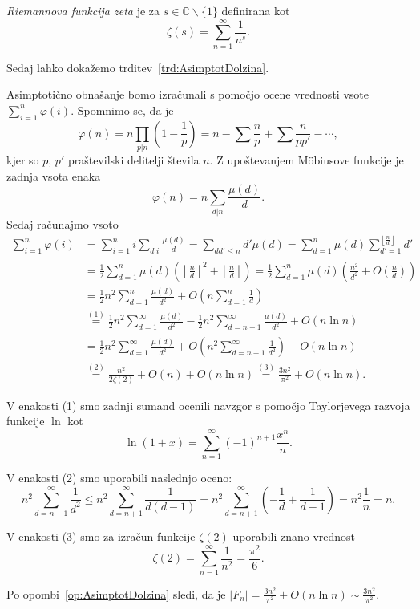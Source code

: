 \documentclass[mat1]{fmfdelo}
\begin{document}
\begin{definicija}
\emph{Riemannova funkcija zeta} je za
 $s\in\mathbb{C}\backslash\{1\}$
definirana kot
\[ \zeta(s) = \sum_{n=1}^{\infty}\frac{1}{n^s}. \]
\end{definicija}

%
Sedaj lahko dokažemo trditev~\ref{trd:AsimptotDolzina}.

\begin{dokaz}
Asimptotično obnašanje bomo izračunali s pomočjo ocene vrednosti vsote \( \sum_{i=1}^n \varphi(i) \).
Spomnimo se, da je \[ \varphi(n) = n \prod_{p|n} \left (1 - \frac{1}{p} \right ) = n - \sum \frac{n}{p} + \sum \frac{n}{pp'} - \cdots , \]
kjer so $p$, $p'$ praštevilski delitelji števila $n$.  Z upoštevanjem M\"obiusove funkcije je zadnja vsota enaka
\[ \varphi(n) = n \sum_{d|n} \frac{\mu(d)}{d} .\]
Sedaj računajmo vsoto 
%
\begin{align*}
\sum_{i=1}^n \varphi(i)
  &= \sum_{i=1}^n i \sum_{d|i} \frac{\mu(d)}{d} = \sum_{dd'\leq n}d' \mu(d) = 
    \sum_{d=1}^n \mu(d) \sum_{d'=1}^{\left \lfloor \frac{n}{d} \right \rfloor} d' \\
  &= \frac{1}{2} \sum_{d=1}^{n} \mu(d) \left (\left \lfloor \frac{n}{d} \right \rfloor ^2 + \left \lfloor \frac{n}{d} \right \rfloor \right) =
    \frac{1}{2} \sum_{d=1}^{n} \mu(d) \left (\frac{n^2}{d^2} + O \left (\frac{n}{d} \right) \right) \\
  &= \frac{1}{2}n^2 \sum_{d=1}^{n} \frac{\mu(d)}{d^2} + O \left (n \sum_{d=1}^{n} \frac{1}{d} \right ) \\
  &\stackrel{(1)}{=} \frac{1}{2}n^2 \sum_{d=1}^{\infty} \frac{\mu(d)}{d^2} - \frac{1}{2}n^2 \sum_{d=n+1}^{\infty} \frac{\mu(d)}{d^2} + O(n \ln{n}) \\
  &= \frac{1}{2}n^2 \sum_{d=1}^{\infty} \frac{\mu(d)}{d^2} + O \left (n^2\sum_{d=n+1}^{\infty} \frac{1}{d^2} \right ) + O(n \ln{n}) \\
  & \stackrel{(2)}{=} \frac{n^2}{2 \zeta(2)} + O(n) + O(n \ln{n}) \stackrel{(3)}{=} \frac{3n^2}{\pi^2} + O(n \ln{n}).
\end{align*}

V enakosti (1) smo zadnji sumand ocenili navzgor s pomočjo Taylorjevega razvoja funkcije $\ln$ kot
\[ \ln{(1+x)} = \sum_{n=1}^{\infty} (-1)^{n+1} \frac{x^n}{n}.\]

V enakosti (2) smo uporabili naslednjo oceno:
\[ n^2 \sum_{d=n+1}^{\infty} \frac{1}{d^2} \leq n^2 \sum_{d=n+1}^{\infty} \frac{1}{d(d-1)} = 
n^2 \sum_{d=n+1}^{\infty} \left (- \frac{1}{d} + \frac{1}{d-1} \right ) = n^2 \frac{1}{n} = n.\]

V enakosti (3) smo za izračun funkcije $\zeta(2)$ uporabili znano vrednost
\[ \zeta(2) = \sum_{n=1}^{\infty} \frac{1}{n^2} = \frac{\pi^2}{6}.\]

Po opombi~\ref{op:AsimptotDolzina} sledi, da je \(|F_n| = \frac{3n^2}{\pi^2} + O(n \ln{n}) \sim\frac{3n^2}{\pi^2}. \)
\end{dokaz}
\end{document}
